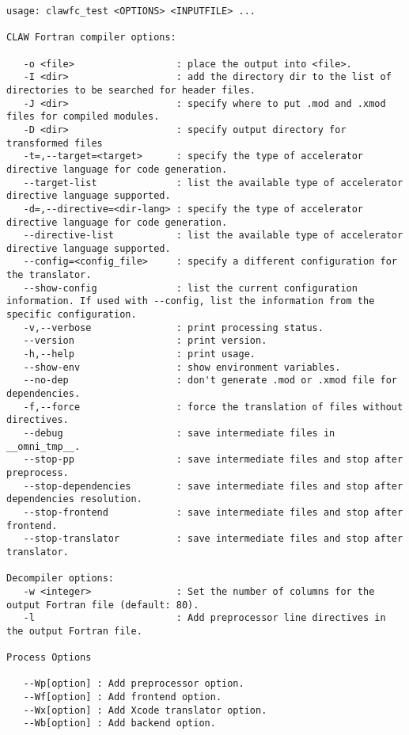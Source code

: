 \documentclass{article}
\begin{document}
\begin{lstlisting}
usage: clawfc_test <OPTIONS> <INPUTFILE> ...

CLAW Fortran compiler options:

   -o <file>                  : place the output into <file>.
   -I <dir>                   : add the directory dir to the list of directories to be searched for header files.
   -J <dir>                   : specify where to put .mod and .xmod files for compiled modules.
   -D <dir>                   : specify output directory for transformed files
   -t=,--target=<target>      : specify the type of accelerator directive language for code generation.
   --target-list              : list the available type of accelerator directive language supported.
   -d=,--directive=<dir-lang> : specify the type of accelerator directive language for code generation.
   --directive-list           : list the available type of accelerator directive language supported.
   --config=<config_file>     : specify a different configuration for the translator.
   --show-config              : list the current configuration information. If used with --config, list the information from the specific configuration.
   -v,--verbose               : print processing status.
   --version                  : print version.
   -h,--help                  : print usage.
   --show-env                 : show environment variables.
   --no-dep                   : don't generate .mod or .xmod file for dependencies.
   -f,--force                 : force the translation of files without directives.
   --debug                    : save intermediate files in __omni_tmp__.
   --stop-pp                  : save intermediate files and stop after preprocess.
   --stop-dependencies        : save intermediate files and stop after dependencies resolution.
   --stop-frontend            : save intermediate files and stop after frontend.
   --stop-translator          : save intermediate files and stop after translator.

Decompiler options:
   -w <integer>               : Set the number of columns for the output Fortran file (default: 80).
   -l                         : Add preprocessor line directives in the output Fortran file.

Process Options

   --Wp[option] : Add preprocessor option.
   --Wf[option] : Add frontend option.
   --Wx[option] : Add Xcode translator option.
   --Wb[option] : Add backend option.
\end{lstlisting}
\end{document}

